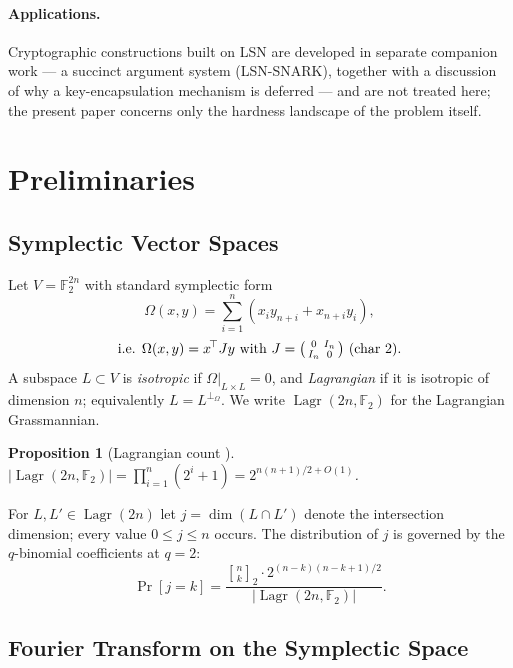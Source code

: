 \documentclass[11pt,a4paper]{article}
\theoremstyle{plain}
\newtheorem{proposition}[theorem]{Proposition}
\theoremstyle{definition}
\newcommand{\F}{\mathbb{F}}
\DeclareMathOperator{\Lagr}{Lagr}
\begin{document}
\paragraph{Applications.} Cryptographic constructions built on LSN are developed in separate companion work --- a succinct argument system (LSN-SNARK), together with a discussion of why a key-encapsulation mechanism is deferred --- and are not treated here; the present paper concerns only the hardness landscape of the problem itself.

\section{Preliminaries}
\label{sec:prelim}

\subsection{Symplectic Vector Spaces}
\label{subsec:symplectic}

Let $V = \F_2^{2n}$ with standard symplectic form
\[
\Omega(x,y) = \sum_{i=1}^n (x_i y_{n+i} + x_{n+i} y_i),
\]
\[
\text{i.e. } \Omega(x,y) = x^{\!\top} J y \text{ with } J = \begin{psmallmatrix} 0 & I_n \\ I_n & 0 \end{psmallmatrix} \text{ (char 2)}.
\]
A subspace $L \subset V$ is \emph{isotropic} if $\Omega|_{L \times L} = 0$, and \emph{Lagrangian} if it is isotropic of dimension $n$; equivalently $L = L^{\perp_\Omega}$. We write $\Lagr(2n, \F_2)$ for the Lagrangian Grassmannian.

\begin{proposition}[Lagrangian count \cite{AG04}]
$|\Lagr(2n, \F_2)| = \prod_{i=1}^n (2^i + 1) = 2^{n(n+1)/2 + O(1)}$.
\end{proposition}

For $L, L' \in \Lagr(2n)$ let $j = \dim(L \cap L')$ denote the intersection dimension; every value $0 \le j \le n$ occurs. The distribution of $j$ is governed by the $q$-binomial coefficients at $q=2$:
\begin{equation}
\label{eq:j-distribution}
\Pr[j=k] = \frac{{n \brack k}_2 \cdot 2^{(n-k)(n-k+1)/2}}{|\Lagr(2n,\F_2)|}.
\end{equation}

\subsection{Fourier Transform on the Symplectic Space}
\label{subsec:fourier}
\end{document}
